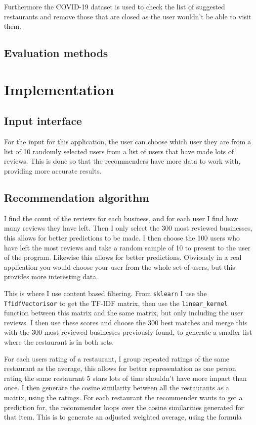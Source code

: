 \documentclass[conference]{IEEEtran}
\begin{document}
Furthermore the COVID-19 dataset is used to check the list of suggested restaurants and remove those that are closed as the user wouldn't be able to visit them.

\subsection{Evaluation methods}

\section{Implementation}

\subsection{Input interface}

For the input for this application, the user can choose which user they are from a list of 10 randomly selected users from a list of users that have made lots of reviews. This is done so that the recommenders have more data to work with, providing more accurate results.

\subsection{Recommendation algorithm}

I find the count of the reviews for each business, and for each user I find how many reviews they have left. Then I only select the 300 most reviewed businesses, this allows for better predictions to be made. I then choose the 100 users who have left the most reviews and take a random sample of 10 to present to the user of the program. Likewise this allows for better predictions. Obviously in a real application you would choose your user from the whole set of users, but this provides more interesting data.

This is where I use content based filtering. From \texttt{sklearn} I use the \texttt{TfidfVectorisor} to get the TF-IDF matrix, then use the \texttt{linear\_kernel} function between this matrix and the same matrix, but only including the user reviews. I then use these scores and choose the 300 best matches and merge this with the 300 most reviewed businesses previously found, to generate a smaller list where the restaurant is in both sets.

For each users rating of a restaurant, I group repeated ratings of the same restaurant as the average, this allows for better representation as one person rating the same restaurant 5 stars lots of time shouldn't have more impact than once. I then generate the cosine similarity between all the restaurants as a matrix, using the ratings. For each restaurant the recommender wants to get a prediction for, the recommender loops over the cosine similarities generated for that item. This is to generate an adjusted weighted average, using the formula
\end{document}
